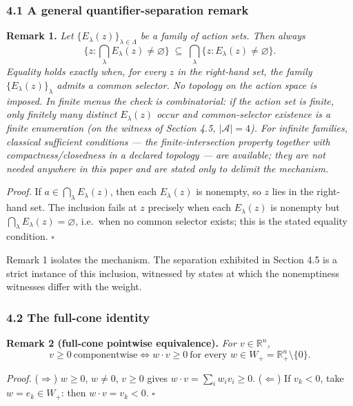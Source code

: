\documentclass[11pt]{article}
\begin{document}
\subsubsection{4.1 A general quantifier-separation
remark}\label{a-general-quantifier-separation-remark}

\textbf{Remark 1.} \emph{Let \(\{E_\lambda(z)\}_{\lambda \in \Lambda}\)
be a family of action sets. Then always}
\[\Big\{ z : \textstyle\bigcap_{\lambda} E_\lambda(z) \neq \varnothing \Big\} \;\subseteq\; \bigcap_{\lambda} \big\{ z : E_\lambda(z) \neq \varnothing \big\}.\]
\emph{Equality holds exactly when, for every \(z\) in the right-hand
set, the family \(\{E_\lambda(z)\}_\lambda\) admits a common selector.
No topology on the action space is imposed. In finite menus the check is
combinatorial: if the action set is finite, only finitely many distinct
\(E_\lambda(z)\) occur and common-selector existence is a finite
enumeration (on the witness of Section 4.5, \(|\mathcal{A}| = 4\)). For
infinite families, classical sufficient conditions --- the
finite-intersection property together with compactness/closedness in a
declared topology --- are available; they are not needed anywhere in
this paper and are stated only to delimit the mechanism.}

\emph{Proof.} If \(a \in \bigcap_\lambda E_\lambda(z)\), then each
\(E_\lambda(z)\) is nonempty, so \(z\) lies in the right-hand set. The
inclusion fails at \(z\) precisely when each \(E_\lambda(z)\) is
nonempty but \(\bigcap_\lambda E_\lambda(z) = \varnothing\), i.e.~when
no common selector exists; this is the stated equality condition. \ensuremath{\square}

Remark 1 isolates the mechanism. The separation exhibited in Section 4.5
is a strict instance of this inclusion, witnessed by states at which the
nonemptiness witnesses differ with the weight.

\subsubsection{4.2 The full-cone identity}\label{the-full-cone-identity}

\textbf{Remark 2 (full-cone pointwise equivalence).} \emph{For
\(v \in \mathbb{R}^n\),}
\[v \ge 0 \ \text{componentwise} \iff w \cdot v \ge 0 \ \text{for every } w \in W_+ = \mathbb{R}^n_+ \setminus \{0\}.\]

\emph{Proof.} (\(\Rightarrow\)) \(w \ge 0\), \(w \neq 0\), \(v \ge 0\)
gives \(w \cdot v = \sum_i w_i v_i \ge 0\). (\(\Leftarrow\)) If
\(v_k < 0\), take \(w = e_k \in W_+\): then \(w \cdot v = v_k < 0\). \ensuremath{\square}
\end{document}
